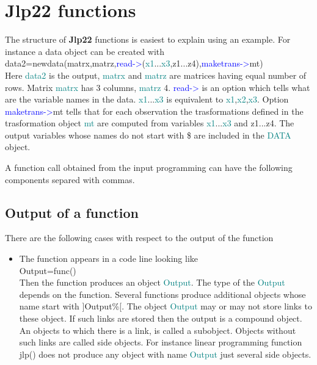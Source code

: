 {\section{\textbf{Jlp22} functions} 
\label{jfuncs0} 
The structure of \textbf{Jlp22} functions is easiest to explain using an example. 
For instance a data object can be created with \\ 
data2=\textcolor{VioletRed}{newdata}(matrx,matrz,\textcolor{blue}{read->}(\textcolor{teal}{x1}...\textcolor{teal}{x3},z1...z4),\textcolor{blue}{maketrans->}mt) \\ 
Here \textcolor{teal}{data2} is the output, \textcolor{teal}{matrx} and \textcolor{teal}{matrz} are matrices having equal number of rows. Matrix 
\textcolor{teal}{matrx} has 3 columns, \textcolor{teal}{matrz} 4. \textcolor{blue}{read->} is an option which tells 
what are the variable names in the data. \textcolor{teal}{x1}...\textcolor{teal}{x3} is equivalent to \textcolor{teal}{x1},\textcolor{teal}{x2},\textcolor{teal}{x3}.  Option 
\textcolor{blue}{maketrans->}mt tells that for each observation the trasformations defined in the trasformation 
object \textcolor{teal}{mt} are computed from variables \textcolor{teal}{x1}...\textcolor{teal}{x3} and z1...z4. The output variables 
whose names do not start with \$ are included in the \textcolor{teal}{DATA} object. 
 
 
A function call obtained from the  input programming can have the 
following components separed with commas. 
\subsection{Output of a function} 
\label{output} 
 
There are the following cases with respect to 
the output of the function 
 
\begin{itemize} 
 
\item The function appears in a code line looking like\\ 
Output=func()\\ 
Then the function produces an object \textcolor{teal}{Output}. The type of the \textcolor{teal}{Output} depends on the function. 
Several functions produce additional objects whose name start with ]Output\%[. The 
object \textcolor{teal}{Output} may or may not store links to these object. If such links are 
stored then the output is a compound object. An objects to which there is a link, is called a subobject. 
Objects without such links are called side objects. For instance linear programming function \textcolor{VioletRed}{jlp}() 
does not produce any object with name \textcolor{teal}{Output} just several side objects. 
 

\end{itemize}}

